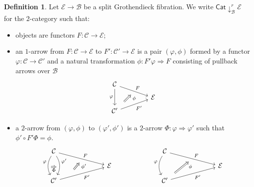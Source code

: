 \documentclass[a4paper,10pt
,draft
]{article}%
\numberwithin{equation}{section}
\numberwithin{figure}{section}
\theoremstyle{definition} %
\newtheorem{definition}[equation]{Definition}%
\newcommand{\1}{\ensuremath{\mathbbm 1}}%
\begin{document}
\begin{definition}
	Let $\mathcal{E} \to \mathcal{B}$ be a split Grothendieck fibration.
	We write $\mathsf{Cat}\downarrow^r_{\mathcal{B}} \mathcal{E}$ for the $2$-category such that:
	\begin{itemize}
		\item objects are functors $F \colon \mathcal{C} \to \mathcal{E}$; 
		
		\item an $1$-arrow from 
		$F \colon \mathcal{C} \to \mathcal{E}$
		to
		$F' \colon \mathcal{C}' \to \mathcal{E}$
		is a pair $(\varphi,\phi)$
		formed by a functor $\varphi\colon \mathcal{C} \to \mathcal{C}'$ and a natural transformation $\phi \colon F' \varphi \Rightarrow F$ consisting of pullback arrows over $\mathcal{B}$
		\begin{equation}
		\begin{tikzcd}[row sep = 5pt, column sep = 40pt]
		\mathcal{C} \arrow{dr}[name=U]{F} \arrow{dd}[swap]{\varphi}
		\\
		& \mathcal{E}
		\\
		|[alias=V]| \mathcal{C}' \arrow{ur}[swap]{F'}
		\arrow[Rightarrow, from=V, to=U,shorten >=0.25cm,shorten <=0.25cm
		,swap,near end,"\phi"
		]
		\end{tikzcd}
		\end{equation}
		
		\item a $2$-arrow from $(\varphi,\phi)$ to $(\varphi',\phi')$ is a $2$-arrow $\Phi \colon \varphi \Rightarrow \varphi'$ such that
		$\phi' \circ F' \Phi = \phi$.
		\begin{equation}
		\begin{tikzcd}[column sep = 65pt,row sep = 7pt]
		\mathcal{C} \arrow{dr}[name=U]{F} 
		\arrow[bend right]{dd}[swap]{\varphi}[name=F]{}
		\arrow[bend left]{dd}{\varphi'}[swap,name=FF]{}
		&
		&
		\mathcal{C} \arrow{dr}[name=U2]{F} 
		\arrow[bend right]{dd}[swap]{\varphi}
		&
		\\
		& \mathcal{E}
		&
		& \mathcal{E}
		\\
		\mathcal{C}' \arrow{ur}[swap]{F'}[near start, name=V]{}
		&
		&
		|[alias=V2]| \mathcal{C}' \arrow{ur}[swap]{F'}
		&
		\arrow[Rightarrow, from=V, to=U,shorten >=0.25cm,shorten <=0.25cm
		,swap,near end,"\phi'"
		]
		\arrow[Rightarrow, from=F, to=FF,shorten >=0.0cm,shorten <=0.0cm
		,swap,"\Phi"
		]
		\arrow[Rightarrow, from=V2, to=U2,shorten >=0.25cm,shorten <=0.25cm
		,swap,near end,"\phi"
		]
		\end{tikzcd}
		\end{equation}
	\end{itemize}
\end{definition}
\end{document}

